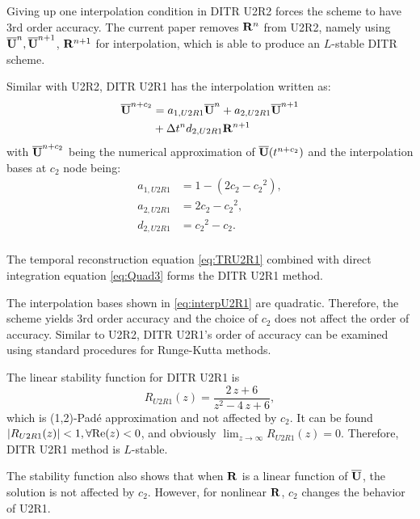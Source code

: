 Giving up one interpolation condition in DITR U2R2
forces the scheme to have 3rd order accuracy.
The current paper removes $\mathbf{R}^{n}$ from U2R2, namely
using $\overline{\mathbf{U}}^{n},\overline{\mathbf{U}}^{n+1}$, $\mathbf{R}^{n+1}$ for interpolation,
which is able to produce an $L$-stable DITR scheme.

Similar with U2R2, DITR U2R1 has the interpolation
written as:
\begin{equation}
    \begin{aligned}
        \label{eq:TRU2R1}
        \overline{\mathbf{U}}^{n+c_2} & =
        a_{1,U2R1}\overline{\mathbf{U}}^{n} +
        a_{2,U2R1}\overline{\mathbf{U}}^{n + 1}
        \\ & +
        {\Delta} t^n d_{2,U2R1}\mathbf{R}^{n + 1}
    \end{aligned}
\end{equation}
with $\overline{\mathbf{U}}^{n+c_2}$ being
the numerical approximation
of $\overline{\mathbf{U}}(t^{n+c_2})$
and the interpolation bases at $c_2$ node being:
\begin{equation}
    \begin{aligned}
        a_{1,U2R1} & = 1 - (2c_2 - {c_2}^2), \\
        a_{2,U2R1} & = 2c_2 - {c_2}^2,       \\
        d_{2,U2R1} & = {c_2}^2 - {c_2}.      \\
    \end{aligned}
    \label{eq:interpU2R1}
\end{equation}

The temporal reconstruction equation \eqref{eq:TRU2R1}
combined with direct integration equation \eqref{eq:Quad3}
forms the DITR U2R1 method.

The interpolation bases shown in \eqref{eq:interpU2R1}
are quadratic.
Therefore, the scheme yields 3rd order accuracy
and the choice of $c_2$ does not affect the order of accuracy.
Similar to U2R2, DITR U2R1's order of accuracy can
be examined using
standard procedures for
Runge-Kutta methods\cite{wanner1996solving}.

The linear stability function for DITR U2R1 is
\begin{equation}
    \label{eq:stabilityFuncU2R1}
    R_{U2R1}(z) = \frac{2\,z+6}{z^2-4\,z+6},
\end{equation}
which is (1,2)-Pad{\'e} approximation and not affected by $c_2$.
It can be found $|R_{U2R1}(z)| < 1, \forall \mathrm{Re}(z) < 0$,
and obviously $\lim_{z\rightarrow\infty}R_{U2R1}(z) = 0$.
Therefore, DITR U2R1 method is $L$-stable.

The stability function also
shows that when $\mathbf{R}$ is a linear function of $\overline{\mathbf{U}}$,
the solution is not
affected by $c_2$.
However, for nonlinear $\mathbf{R}$,
$c_2$ changes the behavior of U2R1.

